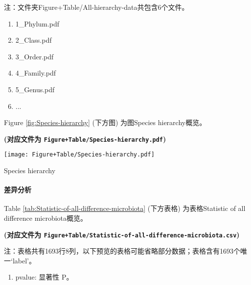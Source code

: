 \documentclass[
]{article}
\providecommand{\tightlist}{%
  \setlength{\itemsep}{0pt}\setlength{\parskip}{0pt}}
\begin{document}
\begin{center}\begin{tcolorbox}[colback=gray!10, colframe=gray!50, width=0.9\linewidth, arc=1mm, boxrule=0.5pt]注：文件夹Figure+Table/All-hierarchy-data共包含6个文件。

\begin{enumerate}\tightlist
\item 1\_Phylum.pdf
\item 2\_Class.pdf
\item 3\_Order.pdf
\item 4\_Family.pdf
\item 5\_Genus.pdf
\item ...
\end{enumerate}\end{tcolorbox}
\end{center}

Figure \ref{fig:Species-hierarchy} (下方图) 为图Species hierarchy概览。

\textbf{(对应文件为 \texttt{Figure+Table/Species-hierarchy.pdf})}

\def\@captype{figure}
\begin{center}
\texttt{[image: Figure+Table/Species-hierarchy.pdf]}
\caption{Species hierarchy}\label{fig:Species-hierarchy}
\end{center}

\hypertarget{diff}{%
\paragraph{差异分析}\label{diff}}

Table \ref{tab:Statistic-of-all-difference-microbiota} (下方表格) 为表格Statistic of all difference microbiota概览。

\textbf{(对应文件为 \texttt{Figure+Table/Statistic-of-all-difference-microbiota.csv})}

\begin{center}\begin{tcolorbox}[colback=gray!10, colframe=gray!50, width=0.9\linewidth, arc=1mm, boxrule=0.5pt]注：表格共有1693行8列，以下预览的表格可能省略部分数据；表格含有1693个唯一`label'。
\end{tcolorbox}
\end{center}
\begin{center}\begin{tcolorbox}[colback=gray!10, colframe=gray!50, width=0.9\linewidth, arc=1mm, boxrule=0.5pt]\begin{enumerate}\tightlist
\item pvalue:  显著性 P。
\end{enumerate}\end{tcolorbox}
\end{center}
\end{document}
